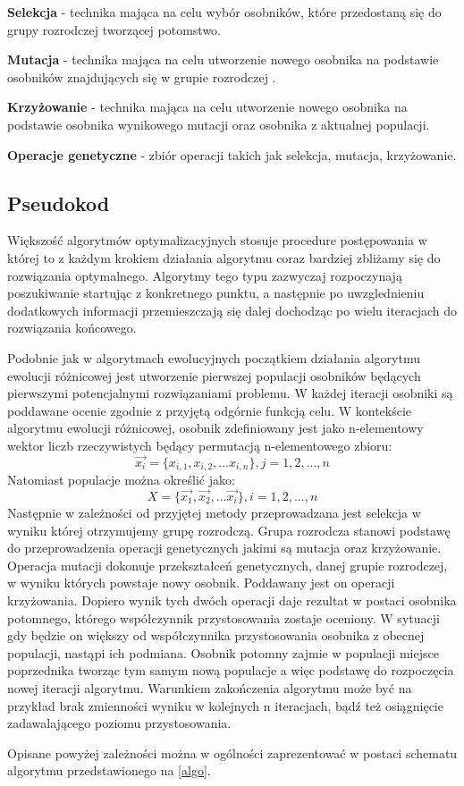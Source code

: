 \textbf{Selekcja} - technika mająca na celu wybór osobników, które przedostaną się do grupy rozrodczej tworzącej potomstwo.

\textbf{Mutacja} - technika mająca na celu utworzenie nowego osobnika na podstawie osobników znajdujących się w grupie rozrodczej .

\textbf{Krzyżowanie} - technika mająca na celu utworzenie nowego osobnika na podstawie osobnika wynikowego mutacji oraz osobnika z aktualnej populacji.

\textbf{Operacje genetyczne} - zbiór operacji takich jak selekcja, mutacja, krzyżowanie.

\subsection{Pseudokod}
\par
 Większość algorytmów optymalizacyjnych stosuje procedure postępowania w której to z każdym krokiem działania algorytmu coraz bardziej zbliżamy się do rozwiązania optymalnego. Algorytmy tego typu zazwyczaj rozpoczynają poszukiwanie startując z konkretnego punktu, a następnie po uwzglednieniu dodatkowych informacji przemieszczają się dalej dochodząc po wielu iteracjach do rozwiązania końcowego.\\
\par
 Podobnie jak w algorytmach ewolucyjnych początkiem działania algorytmu ewolucji różnicowej jest utworzenie pierwszej populacji osobników będących pierwszymi potencjalnymi rozwiązaniami problemu. W każdej iteracji osobniki są poddawane ocenie zgodnie z przyjętą odgórnie funkcją celu. W kontekście algorytmu ewolucji różnicowej, osobnik zdefiniowany jest jako n-elementowy wektor liczb rzeczywistych będący permutacją n-elementowego zbioru:\\
$$
 \overrightarrow{x_{i}}=\{x_{i,1},x_{i,2},...x_{i,n}\}, j = 1,2,...,n
$$
Natomiast populacje można określić jako:\\
$$
X=\{\overrightarrow{x_{1}},\overrightarrow{x_{2}},...\overrightarrow{x_{i}}\}, i = 1,2,...,n
$$
Następnie w zależności od przyjętej metody przeprowadzana jest selekcja w wyniku której otrzymujemy grupę rozrodczą. Grupa rozrodcza stanowi podstawę do przeprowadzenia operacji genetycznych jakimi są mutacja oraz krzyżowanie. Operacja mutacji dokonuje przekształceń genetycznych, danej grupie rozrodczej, w wyniku których powstaje nowy osobnik. Poddawany jest on operacji krzyżowania. Dopiero wynik tych dwóch operacji daje rezultat w postaci osobnika potomnego, którego współczynnik przystosowania zostaje oceniony. W sytuacji gdy będzie on większy od współczynnika przystosowania osobnika z obecnej populacji, nastąpi ich podmiana. Osobnik potomny zajmie w populacji miejsce poprzednika tworząc tym samym nową populacje a więc podstawę do rozpoczęcia nowej iteracji algorytmu. Warunkiem zakończenia algorytmu może być na przykład brak zmienności wyniku w kolejnych n iteracjach, bądź też osiągnięcie zadawalającego poziomu przystosowania.\\
\par
Opisane powyżej zależności można w ogólności zaprezentować w postaci schematu algorytmu przedstawionego na \ref{algo}.

